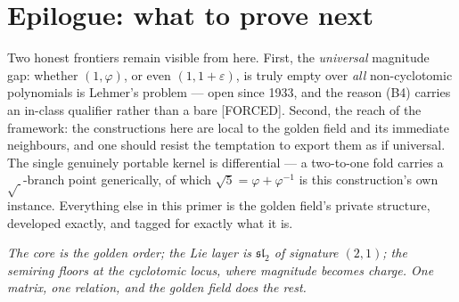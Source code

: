 \documentclass[11pt]{article}
\theoremstyle{plain}
\theoremstyle{definition}
\theoremstyle{remark}
\newcommand{\Forced}{\textcolor{forcedc}{[FORCED]}}
\begin{document}
\section*{Epilogue: what to prove next}
Two honest frontiers remain visible from here. First, the \emph{universal} magnitude gap: whether $(1,φ)$, or even $(1,1+\varepsilon)$, is truly empty over \emph{all} non-cyclotomic polynomials is Lehmer's problem --- open since 1933, and the reason (B4) carries an in-class qualifier rather than a bare \Forced. Second, the reach of the framework: the constructions here are local to the golden field and its immediate neighbours, and one should resist the temptation to export them as if universal. The single genuinely portable kernel is differential --- a two-to-one fold carries a $\sqrt{\ }$-branch point generically, of which $\sqrt5=φ+φ^{-1}$ is this construction's own instance. Everything else in this primer is the golden field's private structure, developed exactly, and tagged for exactly what it is.

\vspace{0.8em}
\noindent\emph{The core is the golden order; the Lie layer is $𝔰𝔩_2$ of signature $(2,1)$; the semiring floors at the cyclotomic locus, where magnitude becomes charge. One matrix, one relation, and the golden field does the rest.}
\end{document}
